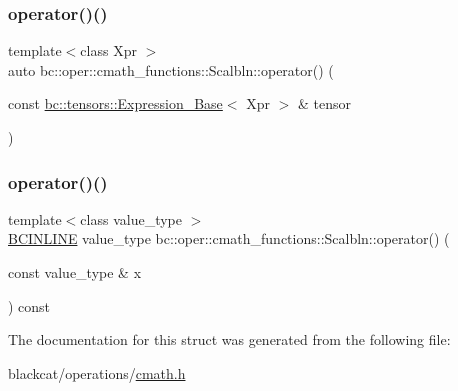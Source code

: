 \mbox{\label{structbc_1_1oper_1_1cmath__functions_1_1Scalbln_a2d70ab46da9ee411a529a5fe55aef11f}} 
\subsubsection{\texorpdfstring{operator()()}{operator()()}\hspace{0.1cm}{\footnotesize\ttfamily [2/3]}}
{\footnotesize\ttfamily template$<$class Xpr $>$ \\
auto bc\+::oper\+::cmath\+\_\+functions\+::\+Scalbln\+::operator() (\begin{DoxyParamCaption}\item[{const \hyperlink{classbc_1_1tensors_1_1Expression__Base}{bc\+::tensors\+::\+Expression\+\_\+\+Base}$<$ Xpr $>$ \&}]{tensor }\end{DoxyParamCaption})\hspace{0.3cm}{\ttfamily [inline]}}

\mbox{\label{structbc_1_1oper_1_1cmath__functions_1_1Scalbln_a52327692a9163cae6a4213d02ad947e8}} 
\subsubsection{\texorpdfstring{operator()()}{operator()()}\hspace{0.1cm}{\footnotesize\ttfamily [3/3]}}
{\footnotesize\ttfamily template$<$class value\+\_\+type $>$ \\
\hyperlink{common_8h_a6699e8b0449da5c0fafb878e59c1d4b1}{B\+C\+I\+N\+L\+I\+NE} value\+\_\+type bc\+::oper\+::cmath\+\_\+functions\+::\+Scalbln\+::operator() (\begin{DoxyParamCaption}\item[{const value\+\_\+type \&}]{x }\end{DoxyParamCaption}) const\hspace{0.3cm}{\ttfamily [inline]}}



The documentation for this struct was generated from the following file\+:\begin{DoxyCompactItemize}
\item 
blackcat/operations/\hyperlink{cmath_8h}{cmath.\+h}\end{DoxyCompactItemize}
